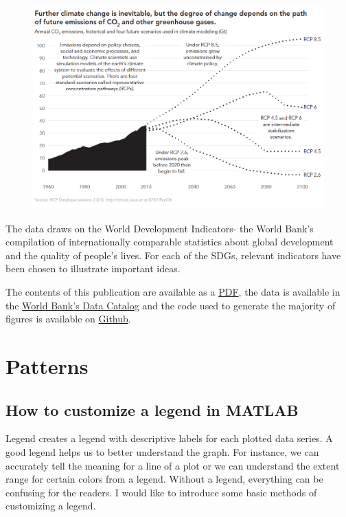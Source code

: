 \documentclass[]{book}
\theoremstyle{definition}
\theoremstyle{definition}
\theoremstyle{definition}
\theoremstyle{remark}
\begin{document}
\begin{figure}
\centering
\includegraphics{images/case study 3.png}
\caption{}
\end{figure}

The data draws on the World Development Indicators- the World Bank's
compilation of internationally comparable statistics about global
development and the quality of people's lives. For each of the SDGs,
relevant indicators have been chosen to illustrate important ideas.

The contents of this publication are available as a
\href{https://openknowledge.worldbank.org/handle/10986/29788}{PDF}, the
data is available in the
\href{https://datacatalog.worldbank.org/dataset/atlas-sustainable-development-goals-2018-world-development-indicators}{World
Bank's Data Catalog} and the code used to generate the majority of
figures is available on
\href{https://github.com/worldbank/sdgatlas2018}{Github}.

\chapter{Patterns}\label{patterns}

\section{How to customize a legend in
MATLAB}\label{how-to-customize-a-legend-in-matlab}

Legend creates a legend with descriptive labels for each plotted data
series. A good legend helps us to better understand the graph. For
instance, we can accurately tell the meaning for a line of a plot or we
can understand the extent range for certain colors from a legend.
Without a legend, everything can be confusing for the readers. I would
like to introduce some basic methods of customizing a legend.
\end{document}
